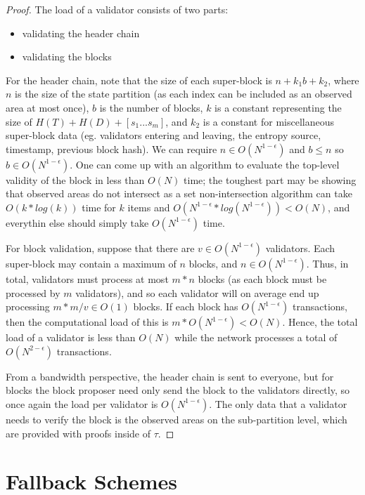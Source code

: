 \documentclass[11pt,a4paper]{report}
\theoremstyle{plain}
\theoremstyle{definition}
\theoremstyle{remark}
\begin{document}
\begin{proof}
The load of a validator consists of two parts:

\begin{itemize}
\item
validating the header chain
\item
validating the blocks
\end{itemize}

For the header chain, note that the size of each super-block is $n+k_1b+k_2$, where $n$ is the size of the state partition (as each index can be included as an observed area at most once), $b$ is the number of blocks, $k$ is a constant representing the size of $H(T) + H(D) + [s_1 ... s_m]$, and $k_2$ is a constant for miscellaneous super-block data (eg. validators entering and leaving, the entropy source, timestamp, previous block hash). We can require $n \in O(N^{1-\epsilon})$ and $b \le n$ so $b \in O(N^{1-\epsilon})$. One can come up with an algorithm to evaluate the top-level validity of the block in less than $O(N)$ time; the toughest part may be showing that observed areas do not intersect as a set non-intersection algorithm can take $O(k*log(k))$ time for $k$ items and $O(N^{1-\epsilon} * log(N^{1-\epsilon})) < O(N)$, and everythin else should simply take $O(N^{1-\epsilon})$ time.

For block validation, suppose that there are $v \in O(N^{1-\epsilon})$ validators. Each super-block may contain a maximum of $n$ blocks, and $n \in O(N^{1-\epsilon})$. Thus, in total, validators must process at most $m*n$ blocks (as each block must be processed by $m$ validators), and so each validator will on average end up processing $m*m/v \in O(1)$ blocks. If each block has $O(N^{1-\epsilon})$ transactions, then the computational load of this is $m * O(N^{1-\epsilon}) < O(N)$. Hence, the total load of a validator is less than $O(N)$ while the network processes a total of $O(N^{2-\epsilon})$ transactions.

From a bandwidth perspective, the header chain is sent to everyone, but for blocks the block proposer need only send the block to the validators directly, so once again the load per validator is $O(N^{1-\epsilon})$. The only data that a validator needs to verify the block is the observed areas on the sub-partition level, which are provided with proofs inside of $\tau$.
\end{proof}

\chapter{Fallback Schemes}
\end{document}
